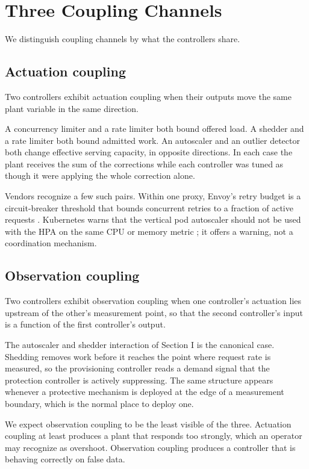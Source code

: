 \documentclass[conference]{IEEEtran}
\begin{document}
\section{Three Coupling Channels}
\label{sec:taxonomy}

We distinguish coupling channels by what the controllers share.

\subsection{Actuation coupling}

Two controllers exhibit actuation coupling when their outputs move the same
plant variable in the same direction.

A concurrency limiter and a rate limiter both bound offered load. A shedder
and a rate limiter both bound admitted work. An autoscaler and an outlier
detector both change effective serving capacity, in opposite directions. In
each case the plant receives the sum of the corrections while each
controller was tuned as though it were applying the whole correction alone.

Vendors recognize a few such pairs. Within one proxy, Envoy's retry budget
is a circuit-breaker threshold that bounds concurrent retries to a fraction
of active requests \cite{envoycb}. Kubernetes warns that the vertical pod
autoscaler should not be used with the HPA on the same CPU or memory
metric \cite{vpalimits}; it offers a warning, not a coordination mechanism.

\subsection{Observation coupling}

Two controllers exhibit observation coupling when one controller's actuation
lies upstream of the other's measurement point, so that the second
controller's input is a function of the first controller's output.

The autoscaler and shedder interaction of Section I is the canonical case.
Shedding removes work before it reaches the point where request rate is
measured, so the provisioning controller reads a demand signal that the
protection controller is actively suppressing. The same structure appears
whenever a protective mechanism is deployed at the edge of a measurement
boundary, which is the normal place to deploy one.

We expect observation coupling to be the least visible of the three. Actuation coupling at least produces a plant that responds
too strongly, which an operator may recognize as overshoot. Observation
coupling produces a controller that is behaving correctly on false data.
\end{document}
